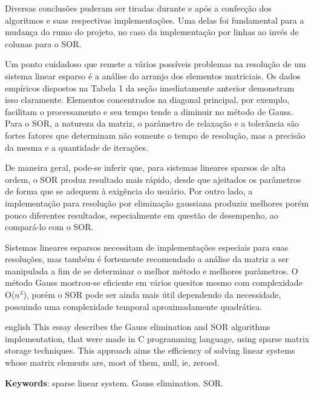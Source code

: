 \documentclass[
	article,			%
	11pt,				%
	oneside,			%
	a4paper,			%
	english,			%
	brazil,				%
	sumario=tradicional
	]{abntex2}
\begin{document}
Diversas conclusões puderam ser tiradas durante e após a confecção dos algoritmos e suas respectivas implementações. Uma delas foi fundamental para a mudança do rumo do projeto, no caso da implementação por linhas ao invés de colunas para o SOR.

Um ponto cuidadoso que remete a vários possíveis problemas na resolução de um sistema linear esparso é a análise do arranjo dos elementos matriciais. Os dados empíricos dispostos na Tabela 1 da seção imediatamente anterior demonstram isso claramente. Elementos concentrados na diagonal principal, por exemplo, facilitam o processamento e seu tempo tende a diminuir no método de Gauss. Para o SOR, a natureza da matriz, o parâmetro de relaxação e a tolerância são fortes fatores que determinam não somente o tempo de resolução, mas a precisão da mesma e a quantidade de iterações.

De maneira geral, pode-se inferir que, para sistemas lineares sparsos de alta ordem, o SOR produz resultado mais rápido, desde que ajeitados os parâmetros de forma que se adequem à exigência do usuário. Por outro lado, a implementação para resolução por eliminação gaussiana produziu melhores porém pouco diferentes resultados, especialmente em questão de desempenho, ao compará-lo com o SOR.

Sistemas lineares esparsos necessitam de implementações especiais para suas resoluções, mas também é fortemente recomendado a análise da matriz a ser manipulada a fim de se determinar o melhor método e melhores parâmetros. O método Gauss mostrou-se eficiente em vários quesitos mesmo com complexidade O($n^3$), porém o SOR pode ser ainda mais útil dependendo da necessidade, possuindo uma complexidade temporal aproximadamente quadrática.

\postextual



\emptythanks
\maketitle

\renewcommand{\resumoname}{Abstract}
\begin{resumoumacoluna}
 \begin{otherlanguage*}{english}
   This essay describes the Gauss elimination and SOR algorithms implementation, that were made in C programming language, using sparse matrix storage techniques. This approach aims the efficiency of solving linear systems whose matrix elements are, most of them, null, ie, zeroed.

   \vspace{\onelineskip}
 
   \noindent
   \textbf{Keywords}: sparse linear system. Gauss elimination. SOR.
 \end{otherlanguage*}  
\end{resumoumacoluna}
\end{document}
